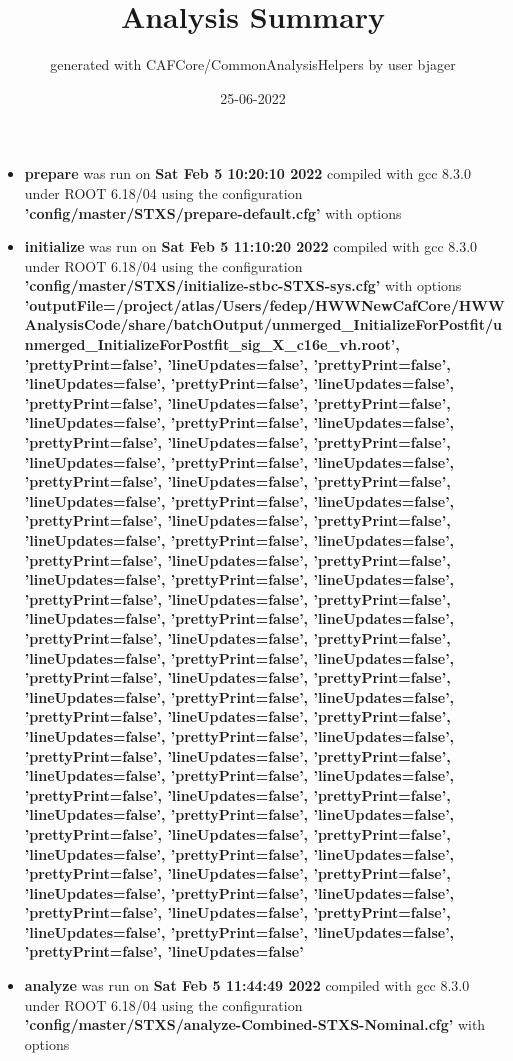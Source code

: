 \documentclass{article}
\title{Analysis Summary}
\author{generated with CAFCore/CommonAnalysisHelpers by user bjager}
\date{25-06-2022}
\begin{document}
\maketitle
\tableofcontents

\begin{itemize}
\item \textbf{prepare} was run on \textbf{Sat Feb  5 10:20:10 2022} compiled with gcc 8.3.0 under ROOT 6.18/04 using the configuration \textbf{'config/master/STXS/prepare-default.cfg'} with options \textbf{} \item \textbf{initialize} was run on \textbf{Sat Feb  5 11:10:20 2022} compiled with gcc 8.3.0 under ROOT 6.18/04 using the configuration \textbf{'config/master/STXS/initialize-stbc-STXS-sys.cfg'} with options \textbf{'outputFile=/project/atlas/Users/fedep/HWWNewCafCore/HWWAnalysisCode/share/batchOutput/unmerged\_InitializeForPostfit/unmerged\_InitializeForPostfit\_sig\_X\_c16e\_vh.root', 'prettyPrint=false', 'lineUpdates=false', 'prettyPrint=false', 'lineUpdates=false', 'prettyPrint=false', 'lineUpdates=false', 'prettyPrint=false', 'lineUpdates=false', 'prettyPrint=false', 'lineUpdates=false', 'prettyPrint=false', 'lineUpdates=false', 'prettyPrint=false', 'lineUpdates=false', 'prettyPrint=false', 'lineUpdates=false', 'prettyPrint=false', 'lineUpdates=false', 'prettyPrint=false', 'lineUpdates=false', 'prettyPrint=false', 'lineUpdates=false', 'prettyPrint=false', 'lineUpdates=false', 'prettyPrint=false', 'lineUpdates=false', 'prettyPrint=false', 'lineUpdates=false', 'prettyPrint=false', 'lineUpdates=false', 'prettyPrint=false', 'lineUpdates=false', 'prettyPrint=false', 'lineUpdates=false', 'prettyPrint=false', 'lineUpdates=false', 'prettyPrint=false', 'lineUpdates=false', 'prettyPrint=false', 'lineUpdates=false', 'prettyPrint=false', 'lineUpdates=false', 'prettyPrint=false', 'lineUpdates=false', 'prettyPrint=false', 'lineUpdates=false', 'prettyPrint=false', 'lineUpdates=false', 'prettyPrint=false', 'lineUpdates=false', 'prettyPrint=false', 'lineUpdates=false', 'prettyPrint=false', 'lineUpdates=false', 'prettyPrint=false', 'lineUpdates=false', 'prettyPrint=false', 'lineUpdates=false', 'prettyPrint=false', 'lineUpdates=false', 'prettyPrint=false', 'lineUpdates=false', 'prettyPrint=false', 'lineUpdates=false', 'prettyPrint=false', 'lineUpdates=false', 'prettyPrint=false', 'lineUpdates=false', 'prettyPrint=false', 'lineUpdates=false', 'prettyPrint=false', 'lineUpdates=false', 'prettyPrint=false', 'lineUpdates=false', 'prettyPrint=false', 'lineUpdates=false', 'prettyPrint=false', 'lineUpdates=false', 'prettyPrint=false', 'lineUpdates=false', 'prettyPrint=false', 'lineUpdates=false', 'prettyPrint=false', 'lineUpdates=false', 'prettyPrint=false', 'lineUpdates=false', 'prettyPrint=false', 'lineUpdates=false', 'prettyPrint=false', 'lineUpdates=false', 'prettyPrint=false', 'lineUpdates=false'} \item \textbf{analyze} was run on \textbf{Sat Feb  5 11:44:49 2022} compiled with gcc 8.3.0 under ROOT 6.18/04 using the configuration \textbf{'config/master/STXS/analyze-Combined-STXS-Nominal.cfg'} with options 
\end{itemize}
\end{document}
